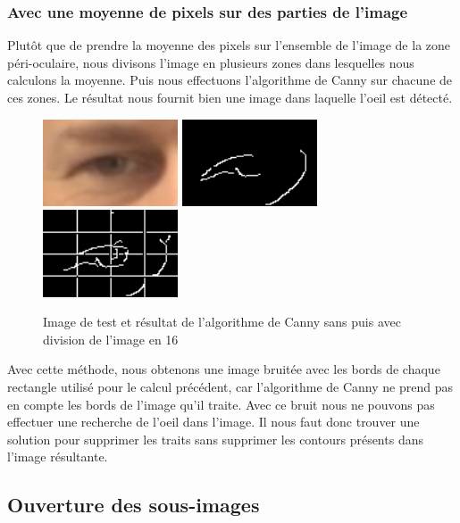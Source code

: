 \subsubsection{Avec une moyenne de pixels sur des parties de l'image}

Plutôt que de prendre la moyenne des pixels sur l'ensemble de l'image de la zone péri-oculaire, nous divisons l'image
en plusieurs zones dans lesquelles nous calculons la moyenne. Puis nous effectuons l'algorithme
de Canny sur chacune de ces zones. Le résultat nous fournit bien une image dans laquelle l'oeil
est détecté.

\begin{figure}[H]
 \center
 \includegraphics[width=4cm]{image/original.png}
 \includegraphics[width=4cm]{image/canny_moyenne.png}
 \includegraphics[width=4cm]{image/canny_decomposition.png}
 \caption{Image de test et résultat de l'algorithme de Canny sans puis avec division de l'image en 16}
\end{figure}

Avec cette méthode, nous obtenons une image bruitée avec les bords de chaque rectangle utilisé
pour le calcul précédent, car l'algorithme de Canny ne prend pas en compte les bords de l'image
qu'il traite. Avec ce bruit nous ne pouvons pas effectuer une recherche de l'oeil dans
l'image. Il nous faut donc trouver une solution pour supprimer les traits
sans supprimer les contours présents dans l'image résultante.

\subsection{Ouverture des sous-images}


